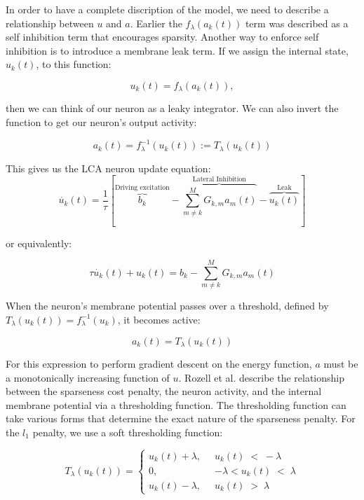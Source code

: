 In order to have a complete discription of the model, we need to describe a relationship between $u$ and $a$. Earlier the $f_{\lambda}(a_{k}(t))$ term was described as a self inhibition term that encourages sparsity. Another way to enforce self inhibition is to introduce a membrane leak term. If we assign the internal state, $u_{k}(t)$, to this function:

\begin{equation}\label{ufunca}
    u_k(t) = f_{\lambda}(a_{k}(t)),
\end{equation}

then we can think of our neuron as a leaky integrator. We can also invert the function to get our neuron's output activity:

\begin{displaymath}\label{athresh}
    a_{k}(t) = f_{\lambda}^{-1}(u_{k}(t)) := T_{\lambda}(u_{k}(t))
\end{displaymath}

This gives us the LCA neuron update equation:
\begin{equation}\label{udot}
    \dot{u_{k}}(t) = \frac{1}{\tau} \left[\overbrace{b_{k}}^\text{Driving excitation} - \overbrace{\sum_{m \neq k}^{M}G_{k,m}a_{m}(t)}^\text{Lateral Inhibition} - \overbrace{u_{k}(t)}^\text{Leak} \right]
\end{equation}

or equivalently:

\begin{displaymath}
    \tau \dot{u_{k}}(t) + u_{k}(t) =  b_{k} - \sum_{m \neq k}^{M}G_{k,m}a_{m}(t)
\end{displaymath}

When the neuron's membrane potential passes over a threshold, defined by $T_{\lambda}(u_{k}(t)) = f_{\lambda}^{-1}(u_{k})$, it becomes active:

\begin{equation}
a_{k}(t) = T_{\lambda}(u_{k}(t))
\end{equation}

For this expression to perform gradient descent on the energy function, $a$ must be a monotonically increasing function of $u$.  Rozell et al. describe the relationship between the sparseness cost penalty, the neuron activity, and the internal membrane potential via a thresholding function. The thresholding function can take various forms that determine the exact nature of the sparseness penalty. For the $l_{1}$ penalty, we use a soft thresholding function:

\begin{equation}
    T_{\lambda}(u_{k}(t)) = \left\{
    \begin{aligned}
        u_{k}(t)+\lambda,\;\; &u_{k}(t)\; <\; -\lambda \\
        0,\;\; &-\lambda < u_{k}(t)\; <\; \lambda \\
        u_{k}(t)-\lambda,\;\; &u_{k}(t)\; >\; \lambda
    \end{aligned}
    \right.
\label{thresholdfunc}
\end{equation}

